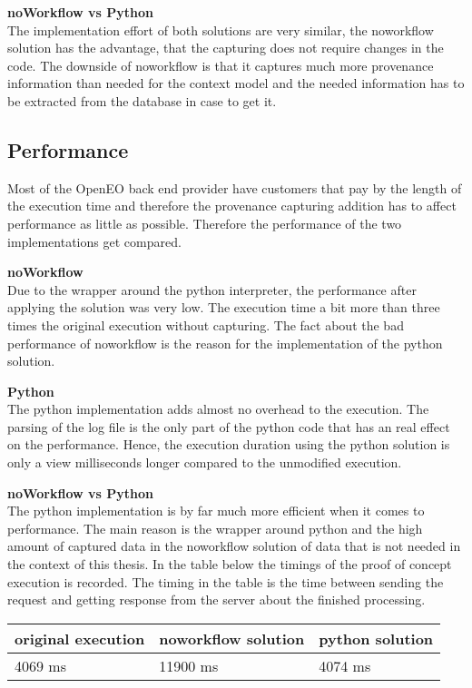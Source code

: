 \documentclass[draft,final]{vutinfth} %
\begin{document}
\textbf{noWorkflow vs Python} \\
The implementation effort of both solutions are very similar, the noworkflow solution has the advantage, that the capturing does not require changes in the code. The downside of noworkflow is that it captures much more provenance information than needed for the context model and the needed information has to be extracted from the database in case to get it. 

\subsection{Performance}\label{NvsP:Performance}
Most of the OpenEO back end provider have customers that pay by the length of the execution time and therefore the provenance capturing addition has to affect performance as little as possible. Therefore the performance of the two implementations get compared.

\textbf{noWorkflow} \\
Due to the wrapper around the python interpreter, the performance after applying the solution was very low. The execution time a bit more than three times the original execution without capturing. The fact about the bad performance of noworkflow is the reason for the implementation of the python solution. 

\textbf{Python} \\
The python implementation adds almost no overhead to the execution. The parsing of the log file is the only part of the python code that has an real effect on the performance. Hence, the execution duration using the python solution is only a view milliseconds longer compared to the unmodified execution.  

\textbf{noWorkflow vs Python} \\
The python implementation is by far much more efficient when it comes to performance. The main reason is the wrapper around python and the high amount of captured data in the noworkflow solution of data that is not needed in the context of this thesis. In the table below the timings of the proof of concept execution is recorded. The timing in the table is the time between sending the request and getting response from the server about the finished processing. 

\begin{table}[]
\centering
	\begin{tabular}{l|l|l}
		\textbf{original execution} & \textbf{noworkflow solution} & \textbf{python solution} \\ \hline
		4069 ms & 11900 ms & 4074 ms \\ 
	\end{tabular}
\end{table}
\end{document}
